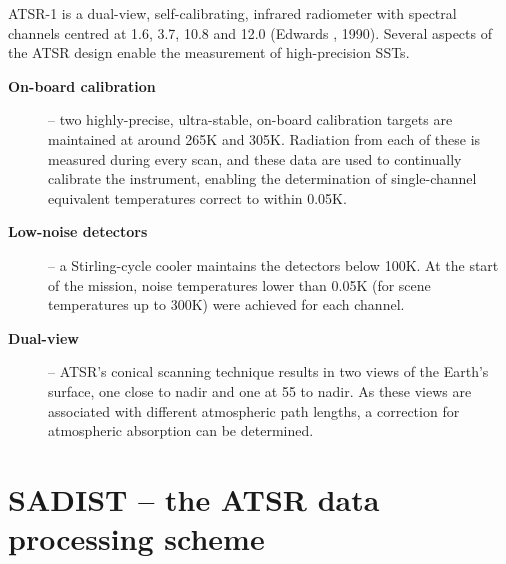ATSR-1 is a dual-view, self-calibrating, infrared radiometer
with spectral channels centred at  1.6{\mic}, 
3.7{\mic}, 10.8{\mic} and 12.0{\mic} (Edwards \etal, 1990).
Several aspects of the ATSR design enable the measurement of 
high-precision SSTs.
\begin{description}
\item[\bf On-board calibration] -- two highly-precise, ultra-stable, 
on-board calibration
targets are  maintained at around 265K and 305K.
Radiation from each of these is measured during every scan,
and these data are used to continually calibrate the instrument, enabling
the determination of single-channel equivalent temperatures
correct to within 0.05K.
\item[\bf Low-noise detectors] -- a Stirling-cycle cooler maintains the
detectors below 100K.
At the start of the mission, noise temperatures lower than 0.05K 
(for scene temperatures up to 300K) were achieved for each 
channel.
\item[\bf Dual-view] -- ATSR's conical scanning technique results in two 
views of the Earth's surface, one close to nadir and one at 
55{\degree} to nadir.
As these views are associated with different atmospheric path
lengths, a correction for atmospheric absorption can be determined.
\end{description}
\clearpage

\section{SADIST -- the ATSR data processing scheme}
\label{app:sad2}

